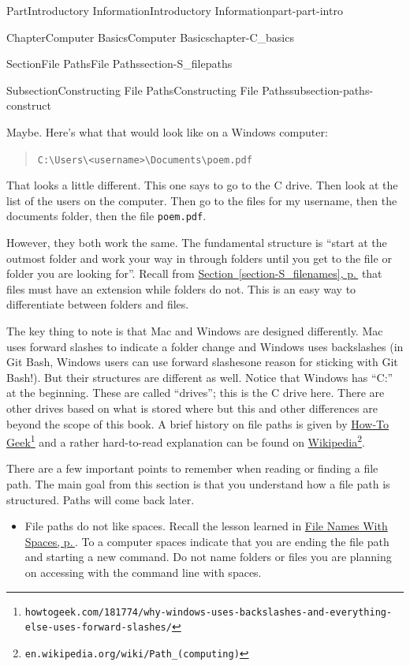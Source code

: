 \documentclass[twoside,10pt,]{book}
\newcommand{\xreffont}{\relax}
\newcommand{\mono}[1]{\texttt{#1}}
\begin{document}
\begin{partptx}{Part}{Introductory Information}{}{Introductory Information}{}{}{part-part-intro}
\begin{chapterptx}{Chapter}{Computer Basics}{}{Computer Basics}{}{}{chapter-C_basics}
\begin{sectionptx}{Section}{File Paths}{}{File Paths}{}{}{section-S_filepaths}
\begin{subsectionptx}{Subsection}{Constructing File Paths}{}{Constructing File Paths}{}{}{subsection-paths-construct}
\par
Maybe. Here's what that would look like on a Windows computer:%
\begin{quote}%
\mono{C:\textbackslash{}Users\textbackslash{}<username>\textbackslash{}Documents\textbackslash{}poem.pdf}%
\end{quote}
That looks a little different. This one says to go to the C drive. Then look at the list of the users on the computer. Then go to the files for my username, then the documents folder, then the file \mono{poem.pdf}.%
\par
However, they both work the same. The fundamental structure is ``start at the outmost folder and work your way in through folders until you get to the file or folder you are looking for''. Recall from \hyperref[section-S_filenames]{Section~{\xreffont\ref{section-S_filenames}}, p.\,\pageref{section-S_filenames}} that files must have an extension while folders do not. This is an easy way to differentiate between folders and files.%
\par
The key thing to note is that Mac and Windows are designed differently. Mac uses forward slashes to indicate a folder change and Windows uses backslashes (in Git Bash, Windows users can use forward slashes\textellipsis{}one reason for sticking with Git Bash!). But their structures are different as well. Notice that Windows has ``C:'' at the beginning. These are called ``drives''; this is the C drive here. There are other drives based on what is stored where but this and other differences are beyond the scope of this book. A brief history on file paths is given by \href{https://www.howtogeek.com/181774/why-windows-uses-backslashes-and-everything-else-uses-forward-slashes/}{How-To Geek}\footnote{\nolinkurl{howtogeek.com/181774/why-windows-uses-backslashes-and-everything-else-uses-forward-slashes/}\label{fn-paths-construct-l-e}} and a rather hard-to-read explanation can be found on \href{https://en.wikipedia.org/wiki/Path_(computing)}{Wikipedia}\footnote{\nolinkurl{en.wikipedia.org/wiki/Path_(computing)}\label{fn-paths-construct-l-g}}.%
\par
There are a few important points to remember when reading or finding a file path. The main goal from this section is that you understand how a file path is structured. Paths will come back later.%
\begin{itemize}[label=\textbullet]
\item{}File paths do not like spaces. Recall the lesson learned in \hyperlink{paragraphs-namesspaces}{File Names With Spaces, p.\,\pageref{paragraphs-namesspaces}}. To a computer spaces indicate that you are ending the file path and starting a new command. Do not name folders or files you are planning on accessing with the command line with spaces.%

\end{itemize}
\end{subsectionptx}
\end{sectionptx}
\end{chapterptx}
\end{partptx}
\end{document}
